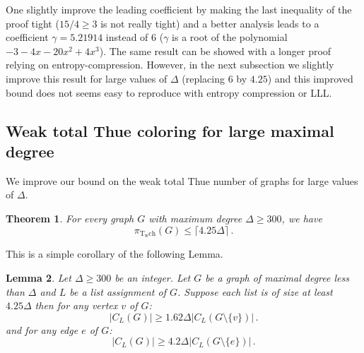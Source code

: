 \documentclass[a4paper,10pt]{article}
\newtheorem{theorem}{Theorem}
\newtheorem{lemma}[theorem]{Lemma}
\begin{document}
One slightly improve the leading coefficient by making the last inequality of the proof tight ($15/4\ge3$ is not really tight) and a better analysis leads to a coefficient $\gamma=5.21914$ instead of $6$ ($\gamma$ is a root of the polynomial $-3 - 4 x - 20 x^2 + 4 x^3$). 
The same result can be showed with a longer proof relying on entropy-compression.
However, in the next subsection we slightly improve this result for large values of $\Delta$ (replacing $6$ by $4.25$) and this improved bound does not seems easy to reproduce with entropy compression or LLL.

\subsection{Weak total Thue coloring for large maximal degree}
We improve our bound on the weak total Thue number of graphs for large values of $\Delta$.
\begin{theorem}\label{weaktotalthuecoloringthmimproved}
 For every graph $G$ with maximum degree $\Delta\ge 300$, we have
 $$\pi_{\operatorname{T_wch}}(G)\le\lceil4.25\Delta\rceil\,.$$ 
\end{theorem}
This is a simple corollary of the following Lemma.
\begin{lemma}
Let $\Delta\ge300$ be an integer.
Let $G$ be a graph of maximal degree less than $\Delta$ and $L$ be a list assignment of $G$.
Suppose each list is of size at least $4.25\Delta$
then for any vertex $v$ of $G$:
 $$|C_L(G)|\ge 1.62\Delta|C_L(G\setminus\{v\})|\,.$$
  and for any edge $e$ of $G$:
 $$|C_L(G)|\ge 4.2\Delta|C_L(G\setminus\{e\})|\,.$$
\end{lemma}
\end{document}
